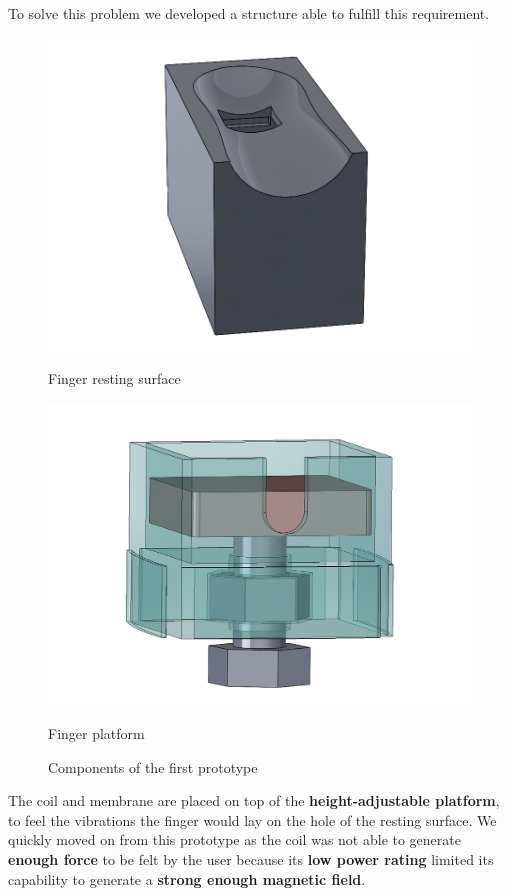 To solve this problem we developed a structure able to fulfill this requirement.
\begin{figure}[H]
    \centering
    \begin{subcaptiongroup}
      \centering
      \parbox[b]{0.2\textwidth}{
        \centering
        \includegraphics[width = 0.9\linewidth]{Figures/finger_holder.png}
        \caption{Finger resting surface}
      }
      \parbox[b]{0.2\textwidth}{
        \centering
        \includegraphics[width = 0.9\linewidth]{Figures/adj_platform.png}
        \caption{Finger platform}
      }
    \end{subcaptiongroup}
    \caption{Components of the first prototype}
\end{figure}
The coil and membrane are placed on top of the \textbf{height-adjustable platform}, to feel the vibrations the finger would lay on the hole of the resting surface.
We quickly moved on from this prototype as the coil was not able to generate \textbf{enough force} to be felt by the user because its \textbf{low power rating} limited its capability to generate a \textbf{strong enough magnetic field}.

